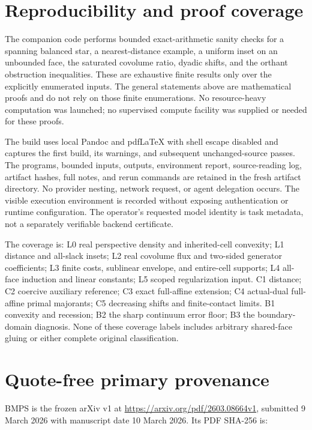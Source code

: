 \documentclass[
  11pt,
]{article}
\begin{document}
\section{Reproducibility and proof
coverage}\label{reproducibility-and-proof-coverage}

The companion code performs bounded exact-arithmetic sanity checks for a
spanning balanced star, a nearest-distance example, a uniform inset on
an unbounded face, the saturated covolume ratio, dyadic shifts, and the
orthant obstruction inequalities. These are exhaustive finite results
only over the explicitly enumerated inputs. The general statements above
are mathematical proofs and do not rely on those finite enumerations. No
resource-heavy computation was launched; no supervised compute facility
was supplied or needed for these proofs.

The build uses local Pandoc and pdfLaTeX with shell escape disabled and
captures the first build, its warnings, and subsequent unchanged-source
passes. The programs, bounded inputs, outputs, environment report,
source-reading log, artifact hashes, full notes, and rerun commands are
retained in the fresh artifact directory. No provider nesting, network
request, or agent delegation occurs. The visible execution environment
is recorded without exposing authentication or runtime configuration.
The operator's requested model identity is task metadata, not a
separately verifiable backend certificate.

The coverage is: L0 real perspective density and inherited-cell
convexity; L1 distance and all-slack insets; L2 real covolume flux and
two-sided generator coefficients; L3 finite costs, sublinear envelope,
and entire-cell supports; L4 all-face induction and linear constants; L5
scoped regularization input. C1 distance; C2 coercive auxiliary
reference; C3 exact full-affine extension; C4 actual-dual full-affine
primal majorants; C5 decreasing shifts and finite-contact limits. B1
convexity and recession; B2 the sharp continuum error floor; B3 the
boundary-domain diagnosis. None of these coverage labels includes
arbitrary shared-face gluing or either complete original classification.

\section{Quote-free primary
provenance}\label{quote-free-primary-provenance}

BMPS is the frozen arXiv v1 at \url{https://arxiv.org/pdf/2603.08664v1},
submitted 9 March 2026 with manuscript date 10 March 2026. Its PDF
SHA-256 is:
\end{document}
